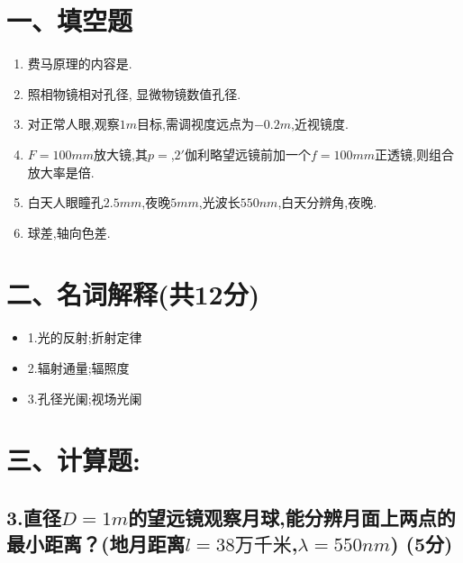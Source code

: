 \documentclass[11pt,a4paper]{article}
\begin{document}
    \section*{一、填空题}
    \begin{enumerate}
        \vspace{0mm}
        \item 费马原理的内容是\underline{\makebox[4cm]{}}.
        \vspace{-3mm}
        \item 照相物镜相对孔径\underline{\makebox[2cm]{}}, 显微物镜数值孔径\underline{\makebox[2cm]{}}.
        \vspace{-3mm}
        \item 对正常人眼,观察$1m$目标,需调\underline{\makebox[2cm]{}}视度远点为$-0.2m$,近视镜\underline{\makebox[2cm]{}}度.
        \vspace{-3mm}
        \item $F=100mm$放大镜,其$p=$\underline{\makebox[2cm]{}},$2'$伽利略望远镜前加一个$f=100mm$正透镜,则组合放大率是\underline{\makebox[2cm]{}}倍.
        \vspace{-3mm}
        \item 白天人眼瞳孔$2.5mm$,夜晚$5mm$,光波长$550nm$,白天分辨角\underline{\makebox[2cm]{}},夜晚\underline{\makebox[2cm]{}}.
        \vspace{-3mm}
        \item 球差\underline{\makebox[4cm]{}},轴向色差\underline{\makebox[4cm]{}}.
        \vspace{-3mm}
    \end{enumerate}
    \section*{二、名词解释(共12分)}
    \begin{itemize}
        \item 1.光的反射;折射定律
        \vspace{10mm}
        \item 2.辐射通量;辐照度
        \vspace{10mm}
        \item 3.孔径光阑;视场光阑
        \vspace{10mm}
    \end{itemize}
    \section*{三、计算题:}
    \subsection*{3.直径$D=1m$的望远镜观察月球,能分辨月面上两点的最小距离？(地月距离$l=38\text{万千米}$,$\lambda =550nm$) (5分)}
    \vspace{10mm}
\end{document}
